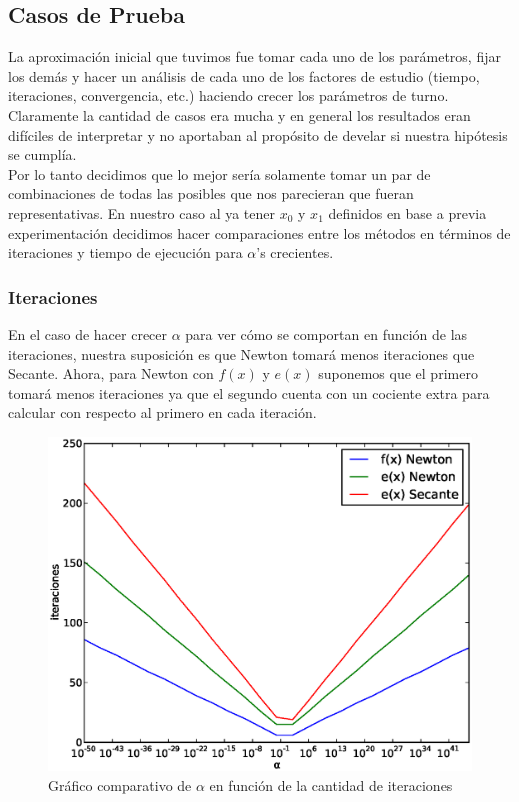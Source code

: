 \subsection{Casos de Prueba}
La aproximación inicial que tuvimos fue tomar cada uno de los parámetros, fijar los demás y hacer un análisis de cada uno de los factores de estudio (tiempo, iteraciones, convergencia, etc.) haciendo crecer los parámetros de turno. Claramente la cantidad de casos era mucha y en general los resultados eran difíciles de interpretar y no aportaban al propósito de develar si nuestra hipótesis se cumplía.\\

Por lo tanto decidimos que lo mejor sería solamente tomar un par de combinaciones de todas las posibles que nos parecieran que fueran representativas. En nuestro caso al ya tener $x_0$ y $x_1$ definidos en base a previa experimentación decidimos hacer comparaciones entre los métodos en términos de iteraciones y tiempo de ejecución para $\alpha$'s crecientes.\\

\subsubsection{Iteraciones} %
\label{ssub:iteraciones}

En el caso de hacer crecer $\alpha$ para ver cómo se comportan en función de las iteraciones, nuestra suposición es que Newton tomará menos iteraciones que Secante. Ahora, para Newton con $f(x)$ y $e(x)$ suponemos que el primero tomará menos iteraciones ya que el segundo cuenta con un cociente extra para calcular con respecto al primero en cada iteración.\\

\begin{figure}[!htbp]
  \begin{center}
    \includegraphics[scale=0.5]{graficos/new/comparacion_iteraciones.eps}
    \caption{\label{fig:comparacion_iteraciones} Gráfico comparativo de $\alpha$ en función de la cantidad de iteraciones}
  \end{center}
\end{figure}

